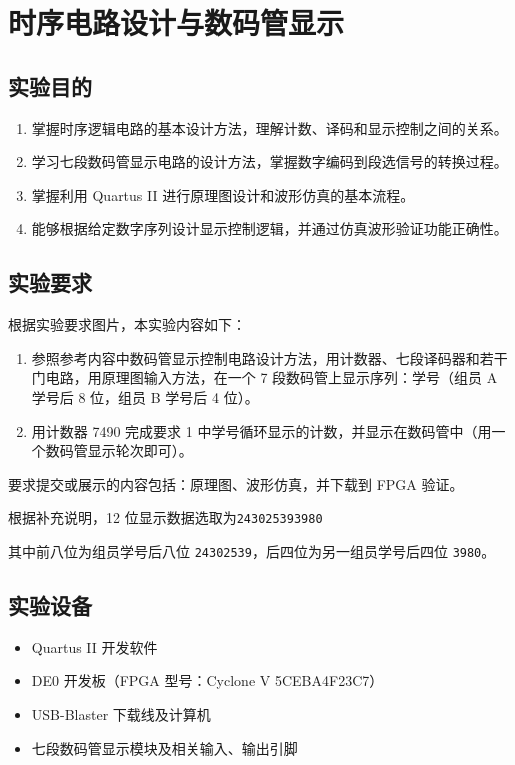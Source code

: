 \documentclass{ctexrep}
\begin{document}
\graphicspath{{../3. segment/figures/}}
\chapter{时序电路设计与数码管显示}

\section{实验目的}

\begin{enumerate}
    \item 掌握时序逻辑电路的基本设计方法，理解计数、译码和显示控制之间的关系。
    \item 学习七段数码管显示电路的设计方法，掌握数字编码到段选信号的转换过程。
    \item 掌握利用 Quartus II 进行原理图设计和波形仿真的基本流程。
    \item 能够根据给定数字序列设计显示控制逻辑，并通过仿真波形验证功能正确性。
\end{enumerate}

\section{实验要求}

根据实验要求图片，本实验内容如下：

\begin{enumerate}
    \item 参照参考内容中数码管显示控制电路设计方法，用计数器、七段译码器和若干门电路，用原理图输入方法，在一个 7 段数码管上显示序列：学号（组员 A 学号后 8 位，组员 B 学号后 4 位）。
    \item 用计数器 7490 完成要求 1 中学号循环显示的计数，并显示在数码管中（用一个数码管显示轮次即可）。
\end{enumerate}

要求提交或展示的内容包括：原理图、波形仿真，并下载到 FPGA 验证。

根据补充说明，12 位显示数据选取为\texttt{243025393980}

其中前八位为组员学号后八位 \texttt{24302539}，后四位为另一组员学号后四位 \texttt{3980}。

\section{实验设备}

\begin{itemize}
    \item Quartus II 开发软件
    \item DE0 开发板（FPGA 型号：Cyclone V 5CEBA4F23C7）
    \item USB-Blaster 下载线及计算机
    \item 七段数码管显示模块及相关输入、输出引脚
\end{itemize}
\end{document}
